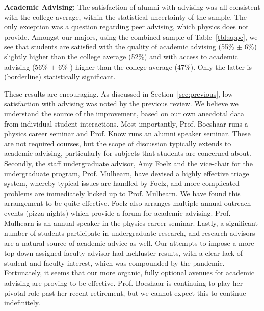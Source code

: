 \documentclass[12pt]{article}
\begin{document}
\noindent
{\bf Academic Advising:}
The satisfaction of alumni with advising was all
consistent with the college average, within the statistical uncertainty
of the sample.  The only exception was a question regarding peer
advising, which physics does not provide.  Amongst our majors, using
the combined sample of Table~\ref{tbl:appc}, we see that students are
satisfied with the quality of academic advising (55\% $\pm$ 6\%)
slightly higher than the college average (52\%) and with access to
academic advising (56\% $\pm$ 6\% ) higher than the college average
(47\%).  Only the latter is (borderline) statistically significant.

These results are encouraging.  As discussed in
Section~\ref{sec:previous}, low satisfaction with advising was noted
by the previous review.  We believe we understand the source of the
improvement, based on our own anecdotal data from individual student
interactions.  Most importantly, Prof. Boeshaar runs a physics career
seminar and Prof. Know runs an alumni speaker seminar.  These are not
required courses, but the scope of discussion typically extends to
academic advising, particularly for subjects that students are
concerned about.  Secondly, the staff undergraduate advisor, Amy Foelz
and the vice-chair for the undergraduate program, Prof. Mulhearn, have
devised a highly effective triage system, whereby typical issues are
handled by Foelz, and more complicated problems are immediately kicked
up to Prof. Mulhearn.  We have found this arrangement to be quite
effective.  Foelz also arranges multiple annual outreach events (pizza
nights) which provide a forum for academic advising.  Prof. Mulhearn
is an annual speaker in the physics career seminar.  Lastly, a
significant number of students participate in undergraduate research,
and research advisors are a natural source of academic advice as well.
Our attempts to impose a more top-down assigned faculty advisor had
lackluster results, with a clear lack of student and faculty interest,
which was compounded by the pandemic.  Fortunately, it seems that our
more organic, fully optional avenues for academic advising are proving
to be effective.  Prof. Boeshaar is continuing to play her pivotal role past
her recent retirement, but we cannot expect this to continue
indefinitely.\\[3pt]
\end{document}
